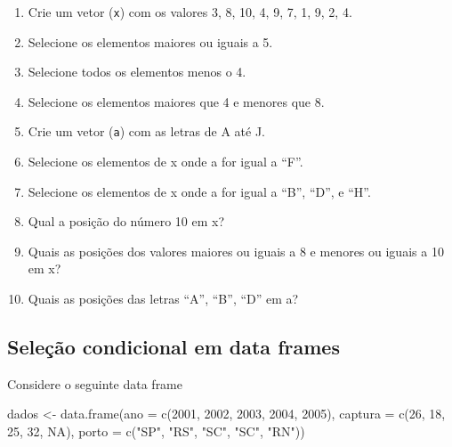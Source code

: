 \documentclass[
  10pt,
  a4paper]{book}
\newenvironment{Shaded}{\begin{snugshade}}{\end{snugshade}}
\newcommand{\AttributeTok}[1]{\textcolor[rgb]{0.77,0.63,0.00}{#1}}
\newcommand{\ConstantTok}[1]{\textcolor[rgb]{0.00,0.00,0.00}{#1}}
\newcommand{\DecValTok}[1]{\textcolor[rgb]{0.00,0.00,0.81}{#1}}
\newcommand{\FunctionTok}[1]{\textcolor[rgb]{0.00,0.00,0.00}{#1}}
\newcommand{\NormalTok}[1]{#1}
\newcommand{\OtherTok}[1]{\textcolor[rgb]{0.56,0.35,0.01}{#1}}
\newcommand{\StringTok}[1]{\textcolor[rgb]{0.31,0.60,0.02}{#1}}
\providecommand{\tightlist}{%
  \setlength{\itemsep}{0pt}\setlength{\parskip}{0pt}}
\begin{document}
\begin{enumerate}
\def\labelenumi{\arabic{enumi}.}
\tightlist
\item
  Crie um vetor (\texttt{x}) com os valores 3, 8, 10, 4, 9, 7, 1, 9, 2, 4.
\item
  Selecione os elementos maiores ou iguais a 5.
\item
  Selecione todos os elementos menos o 4.
\item
  Selecione os elementos maiores que 4 e menores que 8.
\item
  Crie um vetor (\texttt{a}) com as letras de A até J.
\item
  Selecione os elementos de x onde a for igual a ``F''.
\item
  Selecione os elementos de x onde a for igual a ``B'', ``D'', e ``H''.
\item
  Qual a posição do número 10 em x?
\item
  Quais as posições dos valores maiores ou iguais a 8 e menores ou
  iguais a 10 em x?
\item
  Quais as posições das letras ``A'', ``B'', ``D'' em a?
\end{enumerate}

\hypertarget{seleuxe7uxe3o-condicional-em-data-frames}{%
\subsection{Seleção condicional em data frames}\label{seleuxe7uxe3o-condicional-em-data-frames}}

Considere o seguinte data frame

\begin{Shaded}
\begin{Highlighting}[]
\NormalTok{dados }\OtherTok{\textless{}{-}} \FunctionTok{data.frame}\NormalTok{(}\AttributeTok{ano =} \FunctionTok{c}\NormalTok{(}\DecValTok{2001}\NormalTok{, }\DecValTok{2002}\NormalTok{, }\DecValTok{2003}\NormalTok{, }\DecValTok{2004}\NormalTok{, }\DecValTok{2005}\NormalTok{),}
                    \AttributeTok{captura =} \FunctionTok{c}\NormalTok{(}\DecValTok{26}\NormalTok{, }\DecValTok{18}\NormalTok{, }\DecValTok{25}\NormalTok{, }\DecValTok{32}\NormalTok{, }\ConstantTok{NA}\NormalTok{),}
                    \AttributeTok{porto =} \FunctionTok{c}\NormalTok{(}\StringTok{"SP"}\NormalTok{, }\StringTok{"RS"}\NormalTok{, }\StringTok{"SC"}\NormalTok{, }\StringTok{"SC"}\NormalTok{, }\StringTok{"RN"}\NormalTok{))}
\end{Highlighting}
\end{Shaded}
\end{document}
